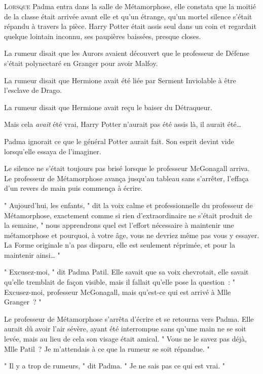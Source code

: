 
\lettrine{L}{orsque}  Padma entra dans la salle de Métamorphose, elle constata que la moitié de la classe était arrivée avant elle et qu'un étrange, qu'un mortel silence s'était répandu à travers la pièce. Harry Potter était assis seul dans un coin et regardait quelque lointain inconnu, ses paupières baissées, presque closes.

La rumeur disait que les Aurors avaient découvert que le professeur de Défense s'était polynectaré en Granger pour avoir Malfoy.

La rumeur disait que Hermione avait été liée par Serment Inviolable à être l'esclave de Drago.

La rumeur disait que Hermione avait reçu le baiser du Détraqueur.

Mais cela \emph{avait} été vrai, Harry Potter n'aurait pas été assis là, il aurait été…

Padma ignorait ce que le général Potter aurait fait. Son esprit devint vide lorsqu'elle essaya de l'imaginer.

Le silence ne s'était toujours pas brisé lorsque le professeur McGonagall arriva. Le professeur de Métamorphose avança jusqu'au tableau sans s'arrêter, l'effaça d'un revers de main puis commença à écrire.

" Aujourd'hui, les enfants, " dit la voix calme et professionnelle du professeur de Métamorphose, exactement comme si rien d'extraordinaire ne s'était produit de la semaine, " nous apprendrons quel est l'effort nécessaire à maintenir une métamorphose et pourquoi, à votre âge, vous ne devriez même pas vous y essayer. La Forme originale n'a pas disparu, elle est seulement réprimée, et pour la maintenir ainsi… "

" Excusez-moi, " dit Padma Patil. Elle savait que sa voix chevrotait, elle savait qu'elle tremblait de façon visible, mais il fallait qu'elle pose la question~: " Excusez-moi, professeur McGonagall, mais qu'est-ce qui est arrivé à Mlle Granger~? "

Le professeur de Métamorphose s'arrêta d'écrire et se retourna vers Padma. Elle aurait dû avoir l'air sévère, ayant été interrompue sans qu'une main ne se soit levée, mais au lieu de cela son visage était amical. " Vous ne le savez pas déjà, Mlle Patil~? Je m'attendais à ce que la rumeur se soit répandue. "

" Il y a trop de rumeurs, " dit Padma. " Je ne sais pas ce qui est vrai. "

